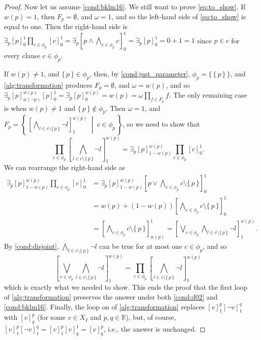 \begin{proof}
  Now let us assume \cref{cond:bklm16}. We still want to prove
  \cref{eq:to_show}. If $w(p) = 1$, then $F_p = \emptyset$, and $\omega = 1$,
  and so the left-hand side of \cref{eq:to_show} is equal to one. Then the
  right-hand side is
  $\exists_p {[p]}_0^1 \prod_{c \in \phi_p} {[c]}_0^1 = \exists_p {\left[ p \land \bigwedge_{c \in \phi_p} c \right]}_0^1 = \exists_p {[p]}_0^1 = 0 + 1 = 1$
  since $p \in c$ for every clause $c \in \phi_p$.

  If $w(p) \ne 1$, and $\{\, p \,\} \in \phi_p$, then, by
  \cref{cond:just_parameter}, $\phi_p = \{\, \{\, p \,\} \,\}$, and
  \cref{alg:transformation} produces $F_p = \emptyset$, and $\omega = w(p)$, and
  so
  $\exists_p {[p]}_{w(\neg p)}^{w(p)} {[p]}_0^1 = \exists_p {[p]}^{w(p)}_0 = w(p) = \omega \prod_{f \in F_p} f$.
  The only remaining case is when $w(p) \ne 1$ and $\{\, p \,\} \not \in \phi_p$.
  Then $\omega = 1$, and
  $F_p = \left\{\, {\left[\bigwedge_{l \in c \setminus \{\, p \,\}} \neg l\right]}_1^{w(p)} \;\middle|\; c \in \phi_p \,\right\}$,
  so we need to show that
  \[
    \prod_{c \in \phi_p} {\left[\bigwedge_{l \in c \setminus \{\, p \,\}} \neg l\right]}_1^{w(p)} = \exists_p {[p]}_{1-w(p)}^{w(p)} \prod_{c \in \phi_p} {[c]}_0^1.
  \]
  We can rearrange the right-hand side as
  \begin{align*}
    \exists_p {[p]}_{1-w(p)}^{w(p)} \prod_{c \in \phi_p} {[c]}_0^1 &= \exists_p {[p]}_{1-w(p)}^{w(p)} {\left[ p \lor \bigwedge_{c \in \phi_p} c \setminus \{\, p \,\} \right]}_0^1 \\
                                                                   &= w(p) + (1-w(p)) {\left[ \bigwedge_{c \in \phi_p} c \setminus \{\, p \,\} \right]}_0^1 \\
                                                                   &= {\left[ \bigwedge_{c \in \phi_p} c \setminus \{\, p \,\} \right]}_{w(p)}^1 = {\left[ \bigvee_{c \in \phi_p} \bigwedge_{l \in c \setminus \{\, p \,\}} \neg l \right]}_1^{w(p)}.
  \end{align*}
  By \cref{cond:disjoint}, $\bigwedge_{l \in c \setminus \{\, p \,\}} \neg l$
  can be true for at most one $c \in \phi_p$, and so
  \[
    {\left[ \bigvee_{c \in \phi_p} \bigwedge_{l \in c \setminus \{\, p \,\}} \neg l \right]}_1^{w(p)} = \prod_{c \in \phi_p} {\left[ \bigwedge_{l \in c \setminus \{\, p \,\}} \neg l \right]}_1^{w(p)}
  \]
  which is exactly what we needed to show. This ends the proof that the first
  loop of \cref{alg:transformation} preserves the answer under both
  \cref{cond:d02} and \cref{cond:bklm16}. Finally, the loop on
   of \cref{alg:transformation}
  replaces ${[v]}_1^p{[\neg v]}_1^q$ with ${[v]}_q^p$ (for some $v \in X_I$ and
  $p, q \in \mathbb{R}$), but, of course,
  ${[v]}_1^p{[\neg v]}_1^q = {[v]}_1^p{[v]}_q^1 = {[v]}_q^p$, i.e., the answer
  is unchanged.
\end{proof}

